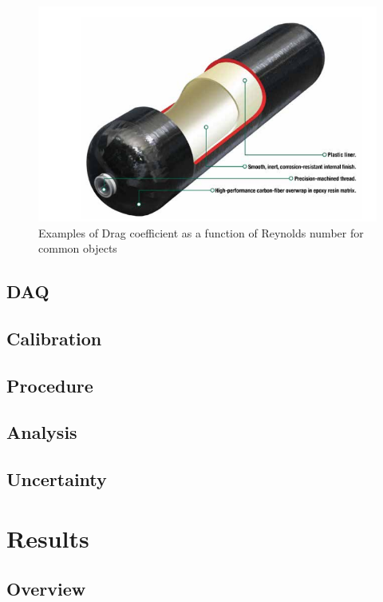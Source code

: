 \documentclass[paper=a4, fontsize=11pt, abstract=on]{scrartcl}
\numberwithin{equation}{section}		%
\numberwithin{figure}{section}			%
\numberwithin{table}{section}				%
\begin{document}
\begin{figure}[H]
\centering
\includegraphics[width=0.95\linewidth]{tschem}
\caption{Examples of Drag coefficient as a function of Reynolds number for common objects}
\label{tschem}
\end{figure}

\subsection{DAQ} 

\subsection{Calibration}


\subsection{Procedure}


\subsection{Analysis}

 
\subsection{Uncertainty} 

\newpage 
   
\section{Results}

\subsection{Overview}
\end{document}
